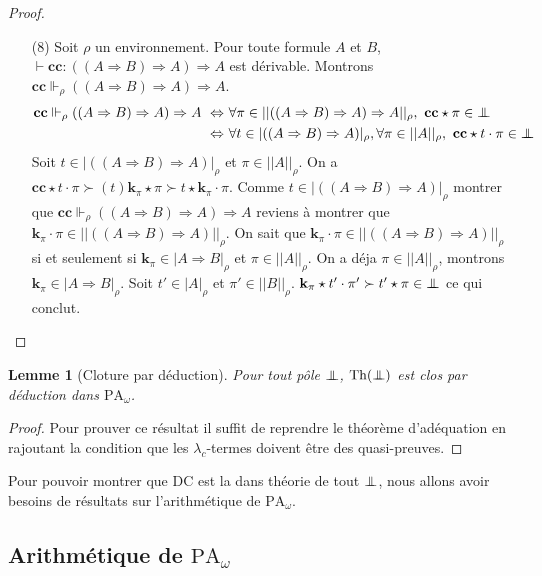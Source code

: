 \documentclass[a4paper,12pt]{article}
\newtheorem{lem}[theo]{Lemme}
\theoremstyle{rmqstyle}
\newcommand{\abs}[1]{\lvert#1\rvert}
\newcommand{\abss}[1]{\lvert \lvert#1\rvert \rvert}
\newcommand{\PA}{\mathrm{PA}}
\renewcommand{\implies}{\Rightarrow}
\renewcommand{\iff}{\Leftrightarrow}
\newcommand{\cc}{\mathbf{cc}}
\renewcommand{\k}{\mathbf{k}}
\newcommand{\pole}{{\protect\mathpalette{\protect\polehelper}{\bot}}} \def\polehelper#1#2{\mathrel{\rlap{$#1#2$}\mkern3mu{#1#2}}}
\newcommand{\Th}{\mathrm{Th}}
\newcommand{\DC}{\mathrm{DC}}
\begin{document}
\begin{proof}
\begin{itemize}
\item[(8)] Soit $\rho$ un environnement. Pour toute formule $A$ et $B$, $\vdash \cc : ((A \implies B) \implies A) \implies A$ est dérivable. Montrons $\cc \Vdash_\rho ((A \implies B) \implies A) \implies A$.
\begin{align*}
\cc \Vdash_\rho ((A \implies B) \implies A) \implies A \ \iff& \ \forall \pi \in \abss{((A \implies B) \implies A) \implies A}_\rho, \ \cc \star \pi \in \pole\\
\iff& \ \forall t \in \abs{((A \implies B) \implies A)}_\rho, \forall \pi \in \abss{A}_\rho, \ \cc \star t \cdot \pi \in \pole
\end{align*}
Soit $t \in \abs{((A \implies B) \implies A)}_\rho$ et $\pi \in \abss{A}_\rho$. On a $ \cc \star t \cdot \pi \succ (t)\k_\pi \star \pi \succ t \star \k_\pi \cdot \pi$. Comme $t \in \abs{((A \implies B) \implies A)}_\rho$ montrer que $\cc \Vdash_\rho ((A \implies B) \implies A) \implies A$ reviens à montrer que $\k_\pi \cdot \pi \in \abss{((A \implies B) \implies A)}_\rho$. On sait que $\k_\pi \cdot \pi \in \abss{((A \implies B) \implies A)}_\rho$ si et seulement si $\k_\pi \in \abs{A \implies B}_\rho$ et $\pi \in \abss{A}_\rho$. On a déja $\pi \in \abss{A}_\rho$, montrons $\k_\pi \in \abs{A \implies B}_\rho$. Soit $t' \in \abs{A}_\rho$ et $\pi' \in \abss{B}_\rho$. $\k_\pi \star t' \cdot \pi' \succ t' \star \pi \in \pole$ ce qui conclut. 
\end{itemize}
\end{proof}

\begin{lem}[Cloture par déduction]
\label{cloture}
Pour tout pôle $\pole$, $\Th(\pole)$ est clos par déduction dans $\PA_\omega$.
\end{lem}

\begin{proof}
Pour prouver ce résultat il suffit de reprendre le théorème d'adéquation en rajoutant la condition que les $\lambda_c$-termes doivent être des quasi-preuves. 
\end{proof}

Pour pouvoir montrer que $\DC$ est la dans théorie de tout $\pole$, nous allons avoir besoins de résultats sur l'arithmétique de $\PA_\omega$.

\clearpage
\subsection{Arithmétique de \( \PA_\omega \)}
\label{arithmetique de PA}
\end{document}
